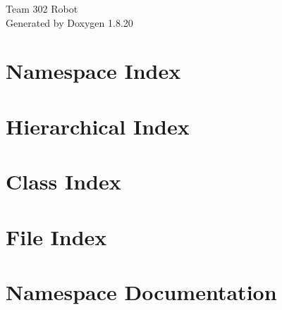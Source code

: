 \let\mypdfximage\pdfximage\def\pdfximage{\immediate\mypdfximage}\documentclass[twoside]{book}
\newcommand{\+}{\discretionary{\mbox{\scriptsize$\hookleftarrow$}}{}{}}
\newcommand{\clearemptydoublepage}{%
  \newpage{\pagestyle{empty}\cleardoublepage}%
}
\begin{document}
\hypersetup{pageanchor=false,
             bookmarksnumbered=true,
             pdfencoding=unicode
            }
\begin{titlepage}
\vspace*{7cm}
\begin{center}%
{\Large Team 302 Robot }\\
\vspace*{1cm}
{\large Generated by Doxygen 1.8.20}\\
\end{center}
\end{titlepage}
\clearemptydoublepage
{}
\tableofcontents
\clearemptydoublepage
{}
\hypersetup{pageanchor=true}

\chapter{Namespace Index}

\chapter{Hierarchical Index}

\chapter{Class Index}

\chapter{File Index}

\chapter{Namespace Documentation}




\end{document}
